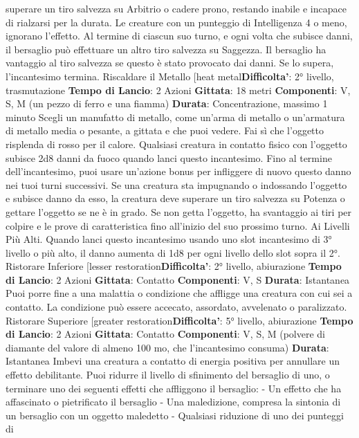 \begin{multicols}{2}
superare un tiro salvezza su Arbitrio o cadere prono,
restando inabile e incapace di rialzarsi per la durata. Le
creature con un punteggio di Intelligenza 4 o meno,
ignorano l’effetto.
Al termine di ciascun suo turno, e ogni volta che
subisce danni, il bersaglio può effettuare un altro tiro
salvezza su Saggezza. Il bersaglio ha vantaggio al tiro
salvezza se questo è stato provocato dai danni. Se lo
supera, l’incantesimo termina.
Riscaldare il Metallo
[heat metal\textbf{Difficolta'}:
2° livello, trasmutazione
\textbf{Tempo di Lancio}: 2 Azioni
\textbf{Gittata}: 18 metri
\textbf{Componenti}: V, S, M (un pezzo di ferro e una fiamma)
\textbf{Durata}: Concentrazione, massimo 1 minuto
Scegli un manufatto di metallo, come un’arma di
metallo o un’armatura di metallo media o pesante, a
gittata e che puoi vedere. Fai sì che l’oggetto risplenda
di rosso per il calore. Qualsiasi creatura in contatto
fisico con l’oggetto subisce 2d8 danni da fuoco quando
lanci questo incantesimo. Fino al termine
dell’incantesimo, puoi usare un’azione bonus per
infliggere di nuovo questo danno nei tuoi turni
successivi.
Se una creatura sta impugnando o indossando l’oggetto
e subisce danno da esso, la creatura deve superare un
tiro salvezza su Potenza o gettare l’oggetto se ne è
in grado. Se non getta l’oggetto, ha svantaggio ai tiri per
colpire e le prove di caratteristica fino all’inizio del suo
prossimo turno.
Ai Livelli Più Alti. Quando lanci questo incantesimo
usando uno slot incantesimo di 3° livello o più alto, il
danno aumenta di 1d8 per ogni livello dello slot sopra il
2°.
Ristorare Inferiore
[lesser restoration\textbf{Difficolta'}:
2° livello, abiurazione
\textbf{Tempo di Lancio}: 2 Azioni
\textbf{Gittata}: Contatto
\textbf{Componenti}: V, S
\textbf{Durata}: Istantanea
Puoi porre fine a una malattia o condizione che affligge
una creatura con cui sei a contatto. La condizione può
essere accecato, assordato, avvelenato o paralizzato.
Ristorare Superiore
[greater restoration\textbf{Difficolta'}:
5° livello, abiurazione
\textbf{Tempo di Lancio}: 2 Azioni
\textbf{Gittata}: Contatto
\textbf{Componenti}: V, S, M (polvere di diamante del valore di
almeno 100 mo, che l’incantesimo consuma)
\textbf{Durata}: Istantanea
Imbevi una creatura a contatto di energia positiva per
annullare un effetto debilitante. Puoi ridurre il livello di
sfinimento del bersaglio di uno, o terminare uno dei
seguenti effetti che affliggono il bersaglio:
- Un effetto che ha affascinato o pietrificato il
bersaglio
- Una maledizione, compresa la sintonia di un
bersaglio con un oggetto maledetto
- Qualsiasi riduzione di uno dei punteggi di

\end{multicols}

